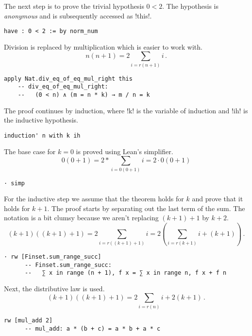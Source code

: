 The next step is to prove the trivial hypothesis $0<2$. The hypothesis is \emph{anonymous} and is subsequently accessed as !this!.
\begin{Verbatim}[firstnumber=last]
  have : 0 < 2 := by norm_num
\end{Verbatim}


Division is replaced by multiplication which is easier to work with.
\[
n(n+1) = 2\sum_{i=r(n+1)} i\,.
\]
\begin{Verbatim}[firstnumber=last]
  apply Nat.div_eq_of_eq_mul_right this
    -- div_eq_of_eq_mul_right:
    --   (0 < n) ∧ (m = n * k) → m / n = k
\end{Verbatim}

The proof continues by induction, where !k! is the variable of induction and !ih! is the inductive hypothesis.
\begin{Verbatim}[firstnumber=last]
  induction' n with k ih
\end{Verbatim}


The base case for $k=0$ is proved using Lean's simplifier.
\[
0(0+1) = 2*\sum_{i=0(0+1)} i = 2\cdot 0(0+1)
\]
\begin{Verbatim}[firstnumber=last]
  · simp
\end{Verbatim}

For the inductive step we assume that the theorem holds for $k$ and prove that it holds for $k+1$. The proof starts by separating out the last term of the sum. The notation is a bit clumsy because we aren't replacing $(k+1)+1$ by $k+2$.
\[
(k+1)((k+1)+1)=2\sum_{i=r((k+1)+1)} i=2\left(\sum_{i=r(k+1)} i + (k+1)\right)\,.
\]
\begin{Verbatim}[firstnumber=last]
  · rw [Finset.sum_range_succ]
      -- Finset.sum_range_succ:
      --   ∑ x in range (n + 1), f x = ∑ x in range n, f x + f n
\end{Verbatim}

Next, the distributive law is used.
\[
(k+1)((k+1)+1)=2\sum_{i=r(n)} i + 2(k+1)\,.
\]
\begin{Verbatim}[firstnumber=last]
    rw [mul_add 2]
      -- mul_add: a * (b + c) = a * b + a * c
\end{Verbatim}

